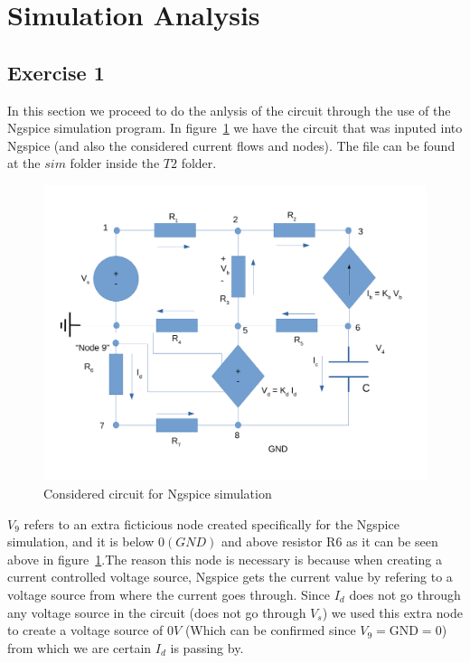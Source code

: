 \newpage
\section{Simulation Analysis}
\label{sec:simulation}

\subsection{Exercise 1}
\label{Simulation Exercise 1}

In this section we proceed to do the anlysis of the circuit through the use of the Ngspice simulation program. In figure~\ref{fig:circuit_simulation} we have the circuit that was inputed into Ngspice (and also the considered current flows and nodes). The file can be found at the $sim$ folder inside the $T2$ folder.

\begin{figure}[!ht] \centering
\includegraphics[width=0.8\linewidth]{circuit_simulation.pdf}
\caption{Considered circuit for Ngspice simulation}
\label{fig:circuit_simulation}
\end{figure}

$V_9$ refers to an extra ficticious node created specifically for the Ngspice simulation, and it is below $0(GND)$ and above resistor R6 as it can be seen above in figure~\ref{fig:circuit_simulation}.The reason this node is necessary is because when creating a current controlled voltage source, Ngspice gets the current value by refering to a voltage source from where the current goes through. Since $I_d$ does not go through any voltage source in the circuit (does not go through $V_s$) we used this extra node to create a voltage source of 0$V$ (Which can be confirmed since $V_9 = $GND$ = 0$) from which we are certain $I_d$ is passing by. 

